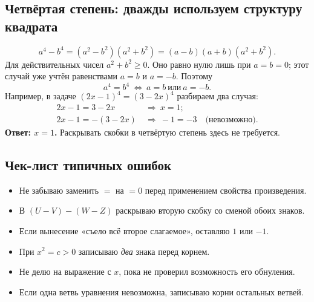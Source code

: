 \documentclass[a4paper,12pt]{article}
\newcommand{\key}[1]{\textcolor{darkaccent}{\textbf{#1}}}
\begin{document}
\subsection*{Четвёртая степень: дважды используем структуру квадрата}
\[
 a^4-b^4=(a^2-b^2)(a^2+b^2)=(a-b)(a+b)(a^2+b^2).
\]
Для действительных чисел \(a^2+b^2\ge0\). Оно равно нулю лишь при \(a=b=0\); этот случай уже учтён равенствами \(a=b\) и \(a=-b\). Поэтому
\[
 \boxed{a^4=b^4\ \Longleftrightarrow\ a=b\ \text{или}\ a=-b.}
\]
Например, в задаче \((2x-1)^4=(3-2x)^4\) разбираем два случая:
\[
\begin{aligned}
2x-1=3-2x&\ \Longrightarrow\ x=1;\\
2x-1=-(3-2x)&\ \Longrightarrow\ -1=-3\quad\text{(невозможно)}.
\end{aligned}
\]
\key{Ответ: \(x=1\).} Раскрывать скобки в четвёртую степень здесь не требуется.

\subsection*{Чек-лист типичных ошибок}
\begin{itemize}
\item[$\square$] Не забываю заменить \(=\) на \(=0\) перед применением свойства произведения.
\item[$\square$] В \((U-V)-(W-Z)\) раскрываю вторую скобку со сменой обоих знаков.
\item[$\square$] Если вынесение «съело всё второе слагаемое», оставляю \(1\) или \(-1\).
\item[$\square$] При \(x^2=c>0\) записываю \emph{два} знака перед корнем.
\item[$\square$] Не делю на выражение с \(x\), пока не проверил возможность его обнуления.
\item[$\square$] Если одна ветвь уравнения невозможна, записываю корни остальных ветвей.
\end{itemize}

\clearpage
\end{document}
